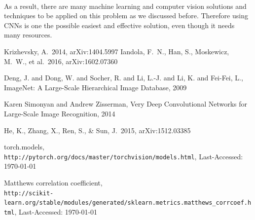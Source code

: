 \paragraph{} As a result, there are many machine learning and computer vision solutions and techniques to be applied on this problem as we discussed before. Therefore using CNNs is one the possible easiest and effective solution, even though it needs many resources.  
\begin{thebibliography}{1} 
 Krizhevsky, A.\ 2014, arXiv:1404.5997 
 Iandola, F.~N., Han, S., Moskewicz, M.~W., et al.\ 2016, arXiv:1602.07360 
 
 Deng, J. and Dong, W. and Socher, R. and Li, L.-J. and Li, K. and Fei-Fei, L., ImageNet: A Large-Scale Hierarchical Image Database, 2009 

 Karen Simonyan and Andrew Zisserman, Very Deep Convolutional Networks for Large-Scale Image Recognition, 2014 

 He, K., Zhang, X., Ren, S., \& Sun, J.\ 2015, arXiv:1512.03385 
 
torch.models,
\\\texttt{http://pytorch.org/docs/master/torchvision/models.html}, Last-Accessed: \today{}

Matthews correlation coefficient,
\\\texttt{http://scikit-learn.org/stable/modules/generated/sklearn.metrics.matthews\_corrcoef.html}, Last-Accessed: \today{}
\end{thebibliography}



